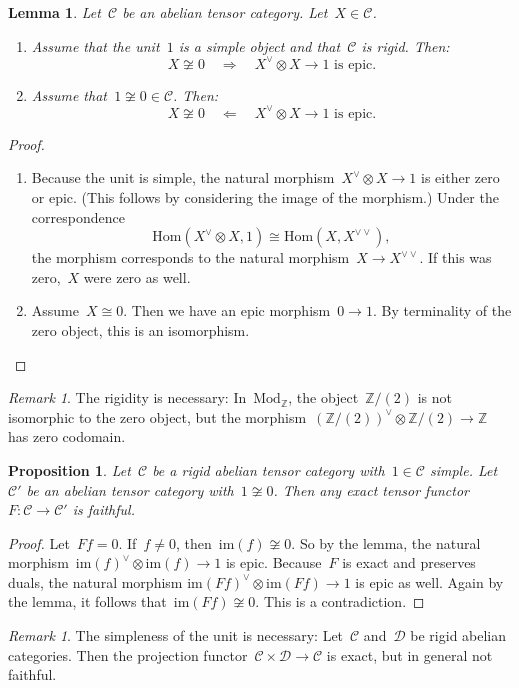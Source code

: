 \documentclass[a4paper,english,12pt]{scrartcl}
\theoremstyle{definition}
\theoremstyle{plain}
\newtheorem{prop}[defn]{Proposition}
\newtheorem{lemma}[defn]{Lemma}
\theoremstyle{remark}
\newtheorem{rem}[defn]{Remark}
\newcommand{\ZZ}{\mathbb{Z}}
\newcommand{\C}{\mathcal{C}}
\newcommand{\D}{\mathcal{D}}
\renewcommand{\_}{\mathpunct{.}\,}
\newcommand{\?}{\,{:}\,}
\newcommand{\Mod}{\mathrm{Mod}}
\renewcommand{\hom}{\mathrm{Hom}}
\newcommand{\im}{\mathrm{im}}
\begin{document}
\begin{lemma}Let~$\C$ be an abelian tensor category. Let~$X \in \C$.
\begin{enumerate}
\item Assume that the unit~$1$ is a simple object and that~$\C$ is rigid. Then:
\[ X \not\cong 0 \quad\Longrightarrow\quad
  \text{$X^\vee \otimes X \to 1$ is epic.} \]
\item Assume that~$1 \not\cong 0 \in \C$. Then:
\[ X \not\cong 0 \quad\Longleftarrow\quad
  \text{$X^\vee \otimes X \to 1$ is epic.} \]
\end{enumerate}
\end{lemma}
\begin{proof}
\begin{enumerate}
\item Because the unit is simple, the natural morphism~$X^\vee \otimes X \to 1$
is either zero or epic. (This follows by considering the image of the
morphism.) Under the correspondence
\[ \hom(X^\vee \otimes X,1) \cong \hom(X,X^{\vee\vee}), \]
the morphism corresponds to the natural morphism~$X \to X^{\vee\vee}$. If this
was zero,~$X$ were zero as well.
\item Assume~$X \cong 0$. Then we have an epic morphism~$0 \to 1$. By
terminality of the zero object, this is an isomorphism.
\end{enumerate}
\end{proof}

\begin{rem}The rigidity is necessary: In~$\Mod_\ZZ$, the object~$\ZZ/(2)$ is
not isomorphic to the zero object, but the morphism~$(\ZZ/(2))^\vee \otimes
\ZZ/(2) \to \ZZ$ has zero codomain.\end{rem}

\begin{prop}Let~$\C$ be a rigid abelian tensor category with~$1 \in \C$ simple.
Let~$\C'$ be an abelian tensor category with~$1 \not\cong 0$. Then any exact
tensor functor~$F : \C \to \C'$ is faithful.\end{prop}
\begin{proof}Let~$Ff = 0$. If~$f \neq 0$, then~$\im(f) \not\cong 0$. So by the
lemma, the natural morphism~$\im(f)^\vee \otimes \im(f) \to 1$ is epic.
Because~$F$ is exact and preserves duals, the natural morphism
$\im(Ff)^\vee \otimes \im(Ff) \to 1$ is epic as well. Again by the lemma, it
follows that~$\im(Ff) \not\cong 0$. This is a contradiction.\end{proof}

\begin{rem}The simpleness of the unit is necessary: Let~$\C$ and~$\D$ be rigid abelian
categories. Then the projection functor~$\C \times \D \to \C$
is exact, but in general not faithful.\end{rem}
\end{document}
